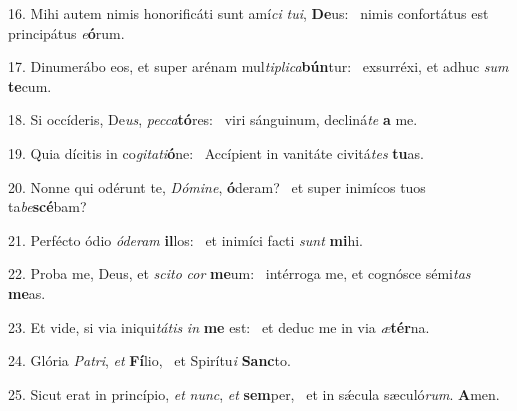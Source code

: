 16. Mihi autem nimis honorificáti sunt amí\textit{ci} \textit{tu}\textit{i}, \textbf{De}us: \ast\  nimis confortátus est principátus \textit{e}\textbf{ó}rum.\

17. Dinumerábo eos, et super arénam mul\textit{ti}\textit{pli}\textit{ca}\textbf{bún}tur: \ast\  exsurréxi, et adhuc \textit{sum} \textbf{te}cum.\

18. Si occíderis, De\textit{us}, \textit{pec}\textit{ca}\textbf{tó}res: \ast\  viri sánguinum, decliná\textit{te} \textbf{a} me.\

19. Quia dícitis in co\textit{gi}\textit{ta}\textit{ti}\textbf{ó}ne: \ast\  Accípient in vanitáte civitá\textit{tes} \textbf{tu}as.\

20. Nonne qui odérunt te, \textit{Dó}\textit{mi}\textit{ne}, \textbf{ó}deram? \ast\  et super inimícos tuos ta\textit{be}\textbf{scé}bam?\

21. Perfécto ódio \textit{ó}\textit{de}\textit{ram} \textbf{il}los: \ast\  et inimíci facti \textit{sunt} \textbf{mi}hi.\

22. Proba me, Deus, et \textit{sci}\textit{to} \textit{cor} \textbf{me}um: \ast\  intérroga me, et cognósce sémi\textit{tas} \textbf{me}as.\

23. Et vide, si via iniqui\textit{tá}\textit{tis} \textit{in} \textbf{me} est: \ast\  et deduc me in via \textit{æ}\textbf{tér}na.\

24. Glória \textit{Pa}\textit{tri}, \textit{et} \textbf{Fí}lio, \ast\  et Spirítu\textit{i} \textbf{Sanc}to.\

25. Sicut erat in princípio, \textit{et} \textit{nunc}, \textit{et} \textbf{sem}per, \ast\  et in sǽcula sæculó\textit{rum}. \textbf{A}men.\

